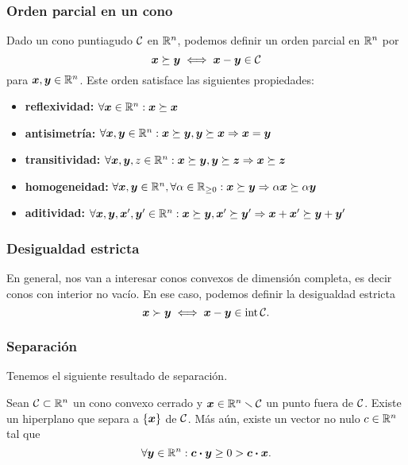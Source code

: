 \documentclass[aspectratio=169,12pt,spanish]{beamer}
\begin{document}

\begin{frame}
\frametitle{Orden parcial en un cono}
Dado un cono puntiagudo $\mathcal{C}$ en $\mathbb{R}^n$, podemos definir un orden parcial en $\mathbb{R}^n$ por
$$
\bm{x} \succeq \bm{y} \iff \bm{x} - \bm{y} \in \mathcal{C}
$$
para $\bm{x}, \bm{y} \in \mathbb{R}^n$. Este orden satisface las siguientes propiedades:
\begin{itemize}
\item \textbf{reflexividad:} $\forall \bm{x} \in \mathbb{R}^n: \bm{x} \succeq \bm{x}$
\item \textbf{antisimetría:} $\forall \bm{x}, \bm{y} \in \mathbb{R}^n: \bm{x} \succeq \bm{y}, \bm{y} \succeq \bm{x} \Rightarrow \bm{x} = \bm{y}$
\item \textbf{transitividad:} $\forall \bm{x}, \bm{y}, z \in \mathbb{R}^n: \bm{x} \succeq \bm{y}, \bm{y} \succeq \bm{z} \Rightarrow \bm{x} \succeq \bm{z}$
\item \textbf{homogeneidad:} $\forall \bm{x}, \bm{y} \in \mathbb{R}^n, \forall \alpha \in \mathbb{R}_{\ge 0}: \bm{x} \succeq \bm{y} \Rightarrow \alpha \bm{x} \succeq \alpha \bm{y}$
\item \textbf{aditividad:} $\forall \bm{x}, \bm{y}, \bm{x}', \bm{y}' \in \mathbb{R}^n: \bm{x} \succeq \bm{y}, \bm{x}' \succeq \bm{y}' \Rightarrow \bm{x} + \bm{x}' \succeq \bm{y} + \bm{y}'$
\end{itemize}

\end{frame}


\begin{frame}
\frametitle{Desigualdad estricta}

En general, nos van a interesar conos convexos de dimensión completa, es decir conos con interior no vacío. En ese caso, podemos definir la desigualdad estricta
$$
\bm{x} \succ \bm{y} \iff \bm{x} - \bm{y} \in \operatorname{int} \mathcal{C}.
$$

\end{frame}


\begin{frame}
\frametitle{Separación}


Tenemos el siguiente resultado de separación.

\begin{lemma} Sean $\mathcal{C} \subset \mathbb{R}^n$ un cono convexo cerrado y $\bm{x} \in \mathbb{R}^n \smallsetminus \mathcal{C}$ un punto fuera de $\mathcal{C}$. Existe un hiperplano que separa a $\{\bm{x}\}$ de $\mathcal{C}$. Más aún, existe un vector no nulo $c \in \mathbb{R}^n$ tal que
$$
\forall \bm{y} \in \mathbb{R}^n : \bm{c} \boldsymbol{\cdot} \bm{y} \ge 0 > \bm{c} \boldsymbol{\cdot} \bm{x}.
$$
\end{lemma}

\end{frame}
\end{document}
